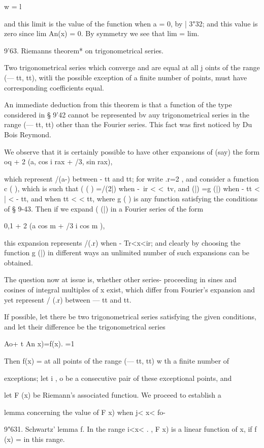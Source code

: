 {w = l

and this limit is the value of the function when a = 0, by | 3"32;
and this value is zero since lim An(x) = 0. By symmetry we see that
lim = lim.

9'63. Riemanns theorem* on trigonometrical series.

Two trigonometrical series which converge and are equal at all j oints
of the range (— tt, tt), witli the possible exception of a finite
number of points, must have corresponding coefficients equal.

An immediate deduction from this theorem is that a function of the
type considered in § 9'42 cannot be represented bv auy trigonometrical
series in the range (— tt, tt) other than the Fourier series. This
fact was first noticed by Du Bois Reymond.

We observe that it is certainly possible to have other expansions of
(say) the form oq + 2 (a, cos i rax + /3, sin rax),

which represent /(a-) between - tt and tt; for write .r=2 , and
consider a function c ( ), which is such that ( ( ) =/(2|) when -\ ir
< <\ tv, and (|) =g (|) when - tt < | < - tt, and when tt < < tt,
where g ( ) is any function satisfying the conditions of § 9-43. Then
if we expand ( (|) in a Fourier series of the form

0,1 + 2 (a cos m + /3 i cos m ),

this expansion represents /(.r) when - Tr<x<ir; and clearly by
choosing the function g (|) in different ways an unlimited number of
such expansions can be obtained.

The question now at issue is, whether other series- proceeding in
sines and cosines of integral multiples of x exist, which differ from
Fourier's expansion and yet represent / (.r) between — tt and tt.

If possible, let there be two trigonometrical series satisfying the
given conditions, and let their difference be the trigonometrical
series

Ao+ t An x)=f(x). =1

Then f(x) = at all points of the range (— tt, tt) w th a finite number
of

exceptions; let i , o be a consecutive pair of these exceptional
points, and

let F (x) be Riemann's associated functiou. We proceed to establish a

lemma concerning the value of F x) when j< x< fo-

9"631. Schwartz' lemma f. In the range i<x< . , F x) is a linear
function of x, if f (x) = in this range.

}
